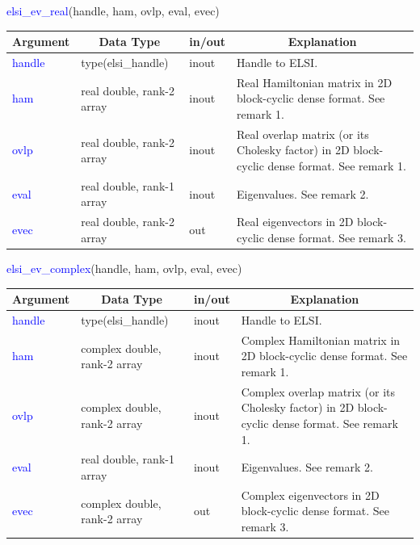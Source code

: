 \documentclass{report}
\begin{document}
\begin{labeling}{\hspace{6cm}}
\item [\hspace{0.3cm} \textcolor{blue}{elsi\_ev\_real}(handle, ham, ovlp, eval, evec)]
\end{labeling}

\begin{tabular}[]{|p{20mm}|p{45mm}|p{15mm}|p{85mm}|}
\hline
\multicolumn{1}{|c|}{\textbf{Argument}} & \multicolumn{1}{c|}{\textbf{Data Type}} & \multicolumn{1}{c|}{\textbf{in/out}} & \multicolumn{1}{c|}{\textbf{Explanation}}\\
\hline
\textcolor{blue}{handle} & type(elsi\_handle)        & inout & Handle to ELSI.\\
\hline
\textcolor{blue}{ham}    & real double, rank-2 array & inout & Real Hamiltonian matrix in 2D block-cyclic dense format.  See remark 1.\\
\hline
\textcolor{blue}{ovlp}   & real double, rank-2 array & inout & Real overlap matrix (or its Cholesky factor) in 2D block-cyclic dense format.  See remark 1.\\
\hline
\textcolor{blue}{eval}   & real double, rank-1 array & inout & Eigenvalues.  See remark 2.\\
\hline
\textcolor{blue}{evec}   & real double, rank-2 array & out   & Real eigenvectors in 2D block-cyclic dense format.  See remark 3.\\
\hline
\end{tabular}

\bigskip
\begin{labeling}{\hspace{6cm}}
\item [\hspace{0.3cm} \textcolor{blue}{elsi\_ev\_complex}(handle, ham, ovlp, eval, evec)]
\end{labeling}

\begin{tabular}[]{|p{20mm}|p{45mm}|p{15mm}|p{85mm}|}
\hline
\multicolumn{1}{|c|}{\textbf{Argument}} & \multicolumn{1}{c|}{\textbf{Data Type}} & \multicolumn{1}{c|}{\textbf{in/out}} & \multicolumn{1}{c|}{\textbf{Explanation}}\\
\hline
\textcolor{blue}{handle} & type(elsi\_handle)           & inout & Handle to ELSI.\\
\hline
\textcolor{blue}{ham}    & complex double, rank-2 array & inout & Complex Hamiltonian matrix in 2D block-cyclic dense format.  See remark 1.\\
\hline
\textcolor{blue}{ovlp}   & complex double, rank-2 array & inout & Complex overlap matrix (or its Cholesky factor) in 2D block-cyclic dense format.  See remark 1.\\
\hline
\textcolor{blue}{eval}   & real double, rank-1 array    & inout & Eigenvalues.  See remark 2.\\
\hline
\textcolor{blue}{evec}   & complex double, rank-2 array & out   & Complex eigenvectors in 2D block-cyclic dense format.  See remark 3.\\
\hline
\end{tabular}
\end{document}
